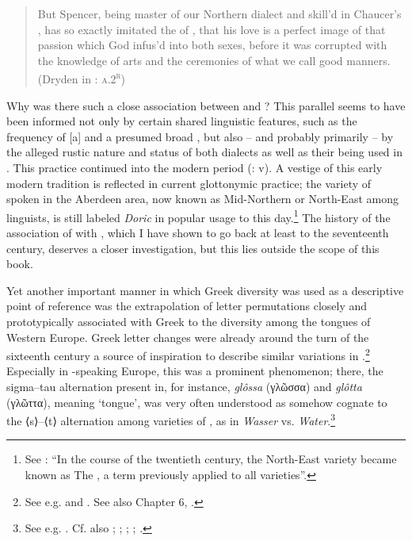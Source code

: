 \begin{quote}
But Spencer, being master of our Northern dialect and skill’d in Chaucer’s , has so exactly imitated the  of , that his love is a perfect image of that passion which God infus’d into both sexes, before it was corrupted with the knowledge of arts and the ceremonies of what we call good manners. (Dryden in \citealt{Virgil1697}: \textsc{a.2}\textsc{\textsuperscript{r}})
\end{quote}

Why was there such a close association between  and ? This parallel seems to have been informed not only by certain shared linguistic features, such as the frequency of [a] and a presumed broad , but also – and probably primarily – by the alleged rustic nature and status of both dialects as well as their being used in . This practice continued into the modern period (\citealt{Colvin1999}: v). A vestige of this early modern tradition is reflected in current glottonymic practice; the variety of  spoken in the Aberdeen area, now known as Mid-Northern or North-East  among linguists, is still labeled \textit{Doric} in popular usage to this day.\footnote{See \citet[116]{Mccoll2007}: “In the course of the twentieth century, the North-East variety became known as The , a term previously applied to all  varieties”.} The history of the association of  with , which I have shown to go back at least to the seventeenth century, deserves a closer investigation, but this lies outside the scope of this book.

Yet another important manner in which Greek diversity was used as a descriptive point of reference was the extrapolation of letter permutations closely and prototypically associated with Greek to the diversity among the tongues of Western Europe. Greek letter changes were already around the turn of the sixteenth century a source of inspiration to describe similar variations in .\footnote{See e.g. \citet[*.ii\textsc{\textsuperscript{v}}]{Manutius1496Aldus} and . See also Chapter 6, .} Especially in -speaking Europe, this was a prominent phenomenon; there, the sigma–tau alternation present in, for instance,  \textit{glôssa} (γλῶσσα) and  \textit{glôtta} (γλῶττα), meaning ‘tongue’, was very often understood as somehow cognate to the ⟨s⟩–⟨t⟩ alternation among varieties of , as in  \textit{Wasser} vs.  \textit{Water}.\footnote{See e.g. \citet[21]{Mylius1612}. Cf. also \citet[\textsc{m}.ii\textsc{\textsuperscript{r}}]{Althamer1536}; \citet[\textsc{a.3}\textsc{\textsuperscript{r}}]{Chytraeus1582}; \citet[119--132]{Reitz1730}; \citet[61--62]{Ruhig1745}; \citet[23--24]{Hof1772}.}

